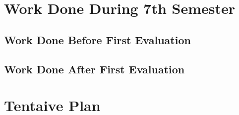 \documentclass[12pt, a4paper,twoside]{article}
\begin{document}
\section{Work Done During 7th Semester}

\subsection{Work Done Before First Evaluation}

\clearpage
\subsection{Work Done After First Evaluation}

\clearpage

\section{Tentaive Plan}

\clearpage
\begin{singlespacing}
{



}
\end{singlespacing}
\end{document}
